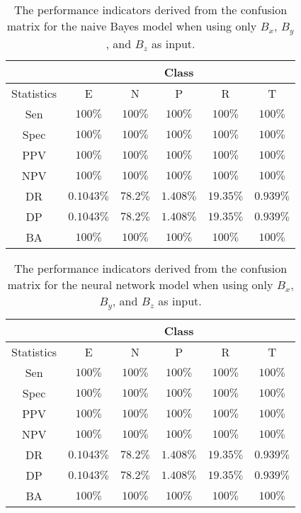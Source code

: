 \begin{table}[!ht]
	\centering
	\begin{tabular}{|c|c|c|c|c|c|}
		\hline
		 & \multicolumn{5}{c|}{Class} \\ \hline
		Statistics & E & N & P & R & T \\ \hline
		Sen & $100\%$ & $100\%$ & $100\%$ & $100\%$ & $100\%$ \\ \hline
		Spec & $100\%$ & $100\%$ & $100\%$ & $100\%$ & $100\%$ \\ \hline
		PPV & $100\%$ & $100\%$ & $100\%$ & $100\%$ & $100\%$ \\ \hline
		NPV & $100\%$ & $100\%$ & $100\%$ & $100\%$ & $100\%$ \\ \hline
		DR & $0.1043\%$ & $78.2\%$ & $1.408\%$ & $19.35\%$ & $0.939\%$ \\ \hline
		DP & $0.1043\%$ & $78.2\%$ & $1.408\%$ & $19.35\%$ & $0.939\%$ \\ \hline
		BA & $100\%$ & $100\%$ & $100\%$ & $100\%$ & $100\%$ \\ \hline
	\end{tabular}
	\caption{The performance indicators derived from the confusion matrix for the naive Bayes model when using only $B_{x}$, $B_{y}$, and $B_{z}$ as input.}
	\label{tab:cs:reverse:coord:nb}
\end{table}

\begin{table}[!ht]
	\centering
	\begin{tabular}{|c|c|c|c|c|c|}
		\hline
		 & \multicolumn{5}{c|}{Class} \\ \hline
		Statistics & E & N & P & R & T \\ \hline
		Sen & $100\%$ & $100\%$ & $100\%$ & $100\%$ & $100\%$ \\ \hline
		Spec & $100\%$ & $100\%$ & $100\%$ & $100\%$ & $100\%$ \\ \hline
		PPV & $100\%$ & $100\%$ & $100\%$ & $100\%$ & $100\%$ \\ \hline
		NPV & $100\%$ & $100\%$ & $100\%$ & $100\%$ & $100\%$ \\ \hline
		DR & $0.1043\%$ & $78.2\%$ & $1.408\%$ & $19.35\%$ & $0.939\%$ \\ \hline
		DP & $0.1043\%$ & $78.2\%$ & $1.408\%$ & $19.35\%$ & $0.939\%$ \\ \hline
		BA & $100\%$ & $100\%$ & $100\%$ & $100\%$ & $100\%$ \\ \hline
	\end{tabular}
	\caption{The performance indicators derived from the confusion matrix for the neural network model when using only $B_{x}$, $B_{y}$, and $B_{z}$ as input.}
	\label{tab:cs:reverse:coord:nnet}
\end{table}

